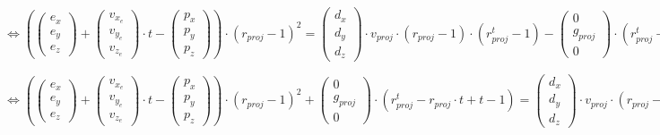 \begin{equation*}
    \Leftrightarrow ({\begin{pmatrix} e_x \\ e_y \\ e_z \end{pmatrix}} + {\begin{pmatrix} v_{x_e} \\ v_{y_e} \\ v_{z_e} \end{pmatrix}} \cdot t - {\begin{pmatrix} p_x \\ p_y \\ p_z \end{pmatrix}}) \cdot (r_{proj} - 1)^2 = {\begin{pmatrix} d_x \\ d_y \\ d_z \end{pmatrix}} \cdot v_{proj} \cdot (r_{proj} - 1) \cdot (r_{proj}^t - 1) - {\begin{pmatrix} 0 \\ g_{proj} \\ 0 \end{pmatrix}} \cdot (r_{proj}^t - r_{proj} \cdot t + t - 1)
\end{equation*}

\begin{equation*}
    \Leftrightarrow ({\begin{pmatrix} e_x \\ e_y \\ e_z \end{pmatrix}} + {\begin{pmatrix} v_{x_e} \\ v_{y_e} \\ v_{z_e} \end{pmatrix}} \cdot t - {\begin{pmatrix} p_x \\ p_y \\ p_z \end{pmatrix}}) \cdot (r_{proj} - 1)^2 + {\begin{pmatrix} 0 \\ g_{proj} \\ 0 \end{pmatrix}} \cdot (r_{proj}^t - r_{proj} \cdot t + t - 1) = {\begin{pmatrix} d_x \\ d_y \\ d_z \end{pmatrix}} \cdot v_{proj} \cdot (r_{proj} - 1) \cdot (r_{proj}^t - 1)
\end{equation*}

